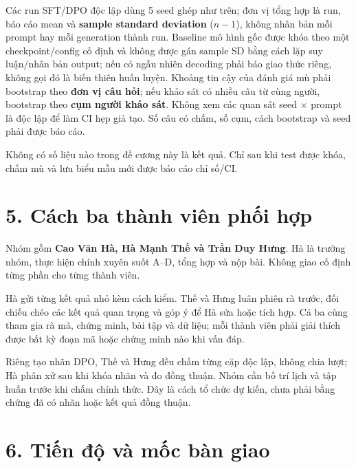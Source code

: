 \documentclass[11pt,a4paper]{article}
\begin{document}
Các run SFT/DPO độc lập dùng 5 seed ghép như trên; đơn vị tổng hợp là
run, báo cáo mean và \textbf{sample standard deviation} (\(n-1\)), không
nhân bản mỗi prompt hay mỗi generation thành run. Baseline mô hình gốc
được khóa theo một checkpoint/config cố định và không được gán sample SD
bằng cách lặp suy luận/nhân bản output; nếu có ngẫu nhiên decoding phải
báo giao thức riêng, không gọi đó là biến thiên huấn luyện. Khoảng tin
cậy của đánh giá mù phải bootstrap theo \textbf{đơn vị câu hỏi}; nếu
khảo sát có nhiều câu từ cùng người, bootstrap theo \textbf{cụm người
khảo sát}. Không xem các quan sát seed × prompt là độc lập để làm CI hẹp
giả tạo. Số câu có chấm, số cụm, cách bootstrap và seed phải được báo
cáo.

Không có số liệu nào trong đề cương này là kết quả. Chỉ sau khi test
được khóa, chấm mù và lưu biểu mẫu mới được báo cáo chỉ số/CI.

\section{5. Cách ba thành viên phối
hợp}\label{cuxe1ch-ba-thuxe0nh-viuxean-phux1ed1i-hux1ee3p}

Nhóm gồm \textbf{Cao Văn Hà, Hà Mạnh Thế và Trần Duy Hưng}. Hà là trưởng
nhóm, thực hiện chính xuyên suốt A--D, tổng hợp và nộp bài. Không giao
cố định từng phần cho từng thành viên.

Hà gửi từng kết quả nhỏ kèm cách kiểm. Thế và Hưng luân phiên rà trước,
đối chiếu chéo các kết quả quan trọng và góp ý để Hà sửa hoặc tích hợp.
Cả ba cùng tham gia rà mã, chứng minh, bài tập và dữ liệu; mỗi thành
viên phải giải thích được bất kỳ đoạn mã hoặc chứng minh nào khi vấn
đáp.

Riêng tạo nhãn DPO, Thế và Hưng đều chấm từng cặp độc lập, không chia
lượt; Hà phân xử sau khi khóa nhãn và đo đồng thuận. Nhóm cần bố trí
lịch và tập huấn trước khi chấm chính thức. Đây là cách tổ chức dự kiến,
chưa phải bằng chứng đã có nhãn hoặc kết quả đồng thuận.

\section{6. Tiến độ và mốc bàn
giao}\label{tiux1ebfn-ux111ux1ed9-vuxe0-mux1ed1c-buxe0n-giao}
\end{document}
